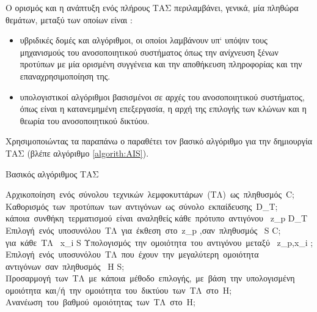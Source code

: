 \documentclass{assignment}
\begin{document}
Ο ορισμός και η ανάπτυξη ενός πλήρους ΤΑΣ περιλαμβάνει, γενικά, μία πληθώρα θεμάτων, μεταξύ των οποίων είναι \cite{engelbrecht,karakasis_thesis}:

\begin{itemize}
\item υβριδικές δομές και αλγόριθμοι, οι οποίοι λαμβάνουν υπ` υπόψιν τους μηχανισμούς του ανοσοποιητικού συστήματος όπως την ανίχνευση ξένων προτύπων με μία ορισμένη συγγένεια και την αποθήκευση πληροφορίας και την επαναχρησιμοποίηση της.
\item υπολογιστικοί αλγόριθμοι βασισμένοι σε αρχές του ανοσοποιητικού συστήματος, όπως είναι η κατανεμημένη επεξεργασία, η αρχή της επιλογής των κλώνων και η θεωρία του ανοσοποιητικού δικτύου.
\end{itemize}


Χρησιμοποιώντας τα παραπάνω ο \citeauthor{engelbrecht} παραθέτει τον βασικό αλγόριθμο για την δημιουργία ΤΑΣ (βλέπε αλγόριθμο \ref{algorith:AIS}). 
\begin{algorithm}                        %
\caption{Βασικός αλγόριθμος ΤΑΣ \cite{engelbrecht}}          %
\label{algorith:AIS}                      %
\begin{program}
\mbox{Αρχικοποίηση ενός σύνολου τεχνικών λεμφοκυττάρων (ΤΛ) ως πληθυσμός }C;
\mbox{Καθορισμός των προτύπων των αντιγόνων ως σύνολο εκπαίδευσης }D_T;
\WHILE \mbox{κάποια συνθήκη τερματισμού είναι αναληθείς} \DO 
  \FOR \mbox{κάθε πρότυπο αντιγόνου } z_p \in D_T \DO
    \mbox{Επιλογή ενός υποσυνόλου ΤΛ για έκθεση στο }z_p \mbox{,σαν πληθυσμός } S \leq C;
    \FOR \mbox{για κάθε ΤΛ } x_i \in S \DO
          \mbox{Υπολογισμός την ομοιότητα του αντιγόνου μεταξύ } z_p,x_i ;
    \END
    \mbox{Επιλογή ενός υποσυνόλου ΤΛ που έχουν την μεγαλύτερη ομοιότητα }
    \mbox{αντιγόνων σαν πληθυσμός } H \leq S;
    \mbox{Προσαρμογή των ΤΛ με κάποια μέθοδο επιλογής, με βάση την υπολογισμένη}
    \mbox{ομοιότητα και/ή την ομοιότητα του δικτύου των ΤΛ στο }H;
    \mbox{Ανανέωση του βαθμού ομοιότητας των ΤΛ στο }H;
  \END
\END
\end{program}
\end{algorithm}
\end{document}
